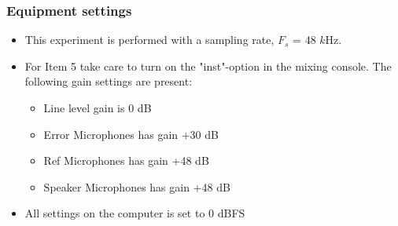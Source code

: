 \subsubsection{Equipment settings}
\begin{itemize}
	\item This experiment is performed with a sampling rate, $F_{s}$ = 48 $k$Hz. 
	\item For Item 5 take care to turn on the "inst"-option in the mixing console. The following gain settings are present: 		
	\begin{itemize}
		\item Line level gain is 0 dB
		\item Error Microphones has gain +30 dB
		\item Ref Microphones has gain +48 dB
		\item Speaker Microphones has gain +48 dB
	\end{itemize}
	\item All settings on the computer is set to 0 dBFS
\end{itemize}
	
	
